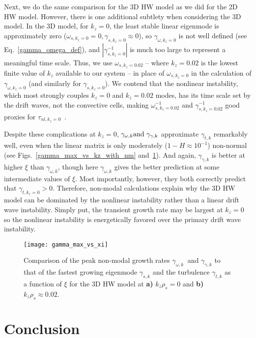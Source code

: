 \documentclass[twocolumn,showkeys,superscriptaddress]{revtex4}
\begin{document}
Next, we do the same comparison for the 3D HW model as we did for the 2D HW model. However, there is one additional subtlety when considering the 3D model. In the 3D model, for $k_z=0$, the least stable linear
eigenmode is approximately zero ($\omega_{s,k_z=0} = 0, \gamma_{s,k_z=0} \approx 0$), so $\gamma_{\omega,k_z=0}$ is not well defined (see Eq.~\ref{gamma_omega_def}), and $|\gamma_{s,k_z=0}^{-1}|$ is much too large to
represent a meaningful time scale. 
Thus, we use $\omega_{s,k_z=0.02}$ -- where $k_z=0.02$ is the lowest finite value of $k_z$ available to our system -- in place of
$\omega_{s,k_z=0}$ in the calculation of $\gamma_{\omega,k_z=0}$ (and similarly for $\gamma_{s,k_z=0}$). 
We contend that the nonlinear instability, which most strongly couples $k_z=0$ and $k_z=0.02$ modes, has its time scale set
by the drift waves, not the convective cells, making $\omega_{s,k_z=0.02}^{-1}$ and $\gamma_{s,k_z=0.02}^{-1}$ good proxies for $\tau_{nl,k_z=0}$~\cite{friedman2014}. 

Despite these complications at $k_z=0$,  $\gamma_{\omega,k} \rm{and} \ \gamma_{\gamma,k}$ approximate $\gamma_{t,k}$ remarkably well, even when the linear matrix is only moderately ($1-H \approx 10^{-1}$) non-normal
(see Figs.~\ref{gamma_max_vs_kz_with_nm} and~\ref{gamma_max_vs_xi}). And again, $\gamma_{\gamma,k}$ is better at higher $\xi$ than $\gamma_{\omega,k}$, though here $\gamma_{\omega,k}$ gives the better prediction
at some intermediate values of $\xi$. Most importantly, however, they both correctly predict that $\gamma_{t,k_z=0} > 0$.
Therefore, non-modal calculations explain why the 3D HW model can be dominated by the nonlinear instability rather than a linear drift wave instability. 
Simply put, the transient growth rate may be largest at $k_z=0$ so the nonlinear instability is energetically favored over the primary drift wave instability.

\begin{figure}
\centerline{\texttt{[image: gamma\_max\_vs\_xi]}}
\caption{Comparison of the peak non-modal growth rates $\gamma_{\omega,k} \ $ and $\gamma_{\gamma,k}$ to that of the fastest growing eigenmode $\gamma_{s,k}$ 
and the turbulence $\gamma_{t,k}$ as a function of $\xi$ for the 3D HW model at {\bf a)} $k_z \rho_s = 0$ and {\bf b)} $k_z \rho_s \approx 0.02$. }
\label{gamma_max_vs_xi}
\end{figure}


\section{Conclusion}
\end{document}
